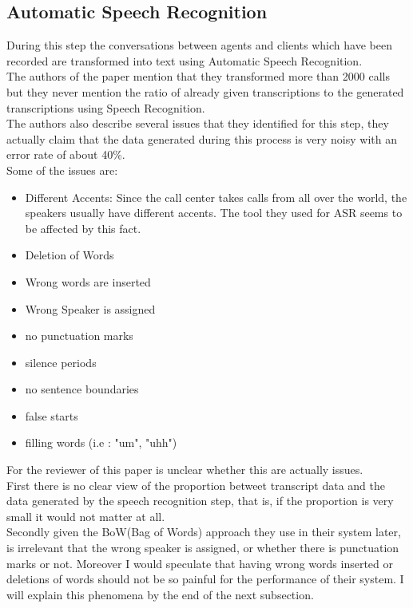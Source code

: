 \documentclass[4pt,a4paper]{article}
\begin{document}
\subsection{Automatic Speech Recognition}
		
During this step the conversations between agents and clients which have been recorded are transformed into text using Automatic Speech Recognition.\\
The authors of the paper mention that they transformed more than 2000 calls  but they never mention the ratio of already given transcriptions to the generated transcriptions using Speech Recognition.\\
The authors also describe several issues that they identified for this step, they actually claim that the data generated during this process is very noisy with an error rate of about 40\%.\\
Some of the issues are:
\begin{itemize}

	\item Different Accents: Since the call center takes calls from all over the world, the speakers usually have different accents. The tool they used for ASR seems to be affected by this fact.
	
	\item Deletion of Words 
	
	\item Wrong words are inserted
	
	\item Wrong Speaker is assigned
	
	\item no punctuation marks
	
	\item silence periods
	
	\item no sentence boundaries
	
	\item false starts
	
	\item filling words (i.e : "um", "uhh")
\end{itemize}

For the reviewer of this paper is unclear whether this are actually issues.\\
First there is no clear view of the proportion betweet transcript data and the data generated by the speech recognition step, that is, if the proportion is very small it would not matter at all.\\
Secondly given the BoW(Bag of Words) approach they use in their system later, is irrelevant that the wrong speaker is assigned, or whether there is punctuation marks or not. Moreover I would speculate that having wrong words inserted or deletions of words should not be so painful for the performance of their system. I will explain this phenomena by the end of the next subsection.
\end{document}

